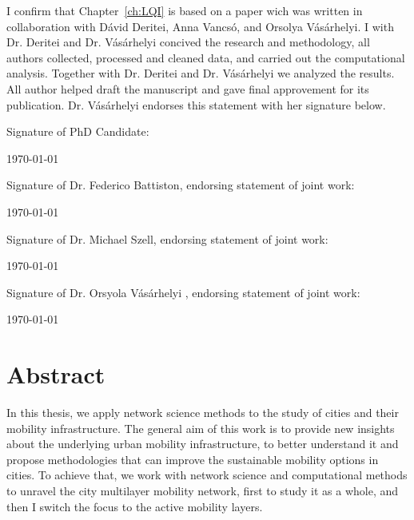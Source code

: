 \documentclass[a4paper,twoside,12pt]{book}
\begin{document}
\vspace{.2cm}

\noindent
I confirm that Chapter~\ref{ch:LQI} is based on a paper wich was written in collaboration with D\'avid Deritei, Anna Vancs\'o, and Orsolya V\'as\'arhelyi. I with Dr. Deritei and Dr. V\'as\'arhelyi concived the research and methodology, all authors collected, processed and cleaned data, and carried out the computational analysis. Together with Dr. Deritei and Dr. V\'as\'arhelyi we analyzed the results. All author helped draft the manuscript and gave final approvement for its publication. Dr. V\'as\'arhelyi endorses this statement with her signature below.

\vspace{0.5cm}
\noindent
Signature of PhD Candidate:

\vspace{2cm}
\noindent
\monthyeardate\today


\vspace{3.5cm}
\noindent
Signature of Dr. Federico Battiston, endorsing statement of joint work:

\vspace{2cm}
\noindent
\monthyeardate\today


\vspace{3.5cm}
\noindent
Signature of Dr. Michael Szell, endorsing statement of joint work:

\vspace{2cm}
\noindent
\monthyeardate\today

\vspace{3.5cm}
\noindent
Signature of Dr. Orsyola V\'as\'arhelyi , endorsing statement of joint work:

\vspace{2cm}
\noindent
\monthyeardate\today




\chapter*{Abstract}
In this thesis, we apply network science methods to the study of cities and their mobility infrastructure. The general aim of this work is to provide new insights about the underlying urban mobility infrastructure, to better understand it and propose methodologies that can improve the sustainable mobility options in cities. To achieve that, we work with network science and computational methods to unravel the city multilayer mobility network, first to study it as a whole, and then I switch the focus to the active mobility layers.
\end{document}
